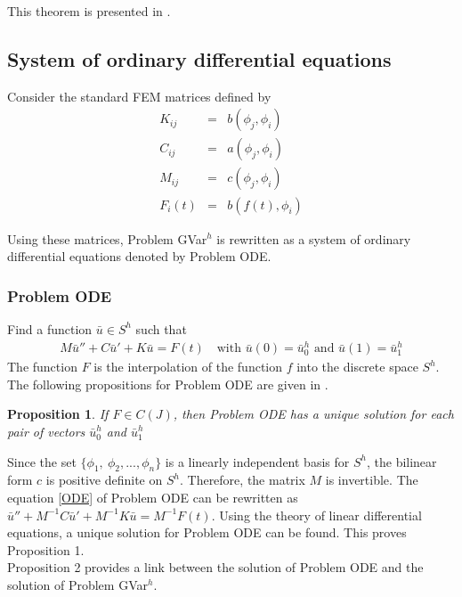 \documentclass[../../main.tex]{subfiles}
\begin{document}
This theorem is presented in \cite{BV13}.

\subsection{System of ordinary differential equations}
Consider the standard FEM matrices defined by
\begin{eqnarray*}
	K_{ij} & = & b(\phi_j, \phi_i)\\
	C_{ij} & = & a(\phi_j, \phi_i)\\
	M_{ij} & = & c(\phi_j, \phi_i)\\
	F_{i}(t) & = & b(f(t), \phi_i)
\end{eqnarray*}

Using these matrices, Problem GVar$^h$ is rewritten as a system of ordinary differential equations denoted by Problem ODE.
\subsubsection*{Problem ODE}
Find a function $\bar{u} \in S^h$ such that
\begin{eqnarray}
	M\bar{u}'' + C \bar{u}' + K\bar{u} = F(t) \ \ \ \textrm{ with } \bar{u}(0) = \bar{u}^h_0 \textrm{ and }  \bar{u}(1) = \bar{u}^h_1 \label{ODE}
\end{eqnarray}
The function $F$ is the interpolation of the function $f$ into the discrete space $S^h$.\\

The following propositions for Problem ODE are given in \cite{BV13}.

\newtheorem{DC_Prop2}{Proposition}
\begin{DC_Prop2}
	If $F\in C(J)$, then Problem ODE has a unique solution for each pair of vectors $\bar{u}^h_0$ and $\bar{u}^h_1$
\end{DC_Prop2}

Since the set $\{\phi_1, \ \phi_2,...,\phi_n\}$ is a linearly independent basis for $S^h$, the bilinear form $c$ is positive definite on $S^h$. Therefore, the matrix $M$ is invertible. The equation \eqref{ODE} of Problem ODE can be rewritten as $\bar{u}'' + M^{-1}C\bar{u}' + M^{-1}K \bar{u} = M^{-1}F(t)$. Using the theory of linear differential equations, a unique solution for Problem ODE can be found. This proves Proposition 1.\\

Proposition 2 provides a link between the solution of Problem ODE and the solution of Problem GVar$^h$.
\end{document}
